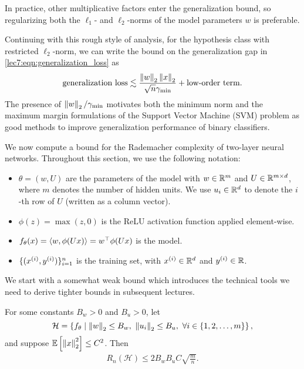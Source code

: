     In practice, other multiplicative factors enter the generalization bound, so regularizing both the $\ell_1$- and $\ell_2$-norms of the model parameters $w$ is preferable.

    Continuing with this rough style of analysis, for the hypothesis class with restricted $\ell_2$-norm, we can write the bound on the generalization gap in \eqref{lec7:eqn:generalization_loss} as
    \begin{equation}
        \text{generalization loss} \lesssim \frac{\Norm{w}_2\Norm{x}_2}{\sqrt{n}\gamma_{\mathrm{min}}} + \text{low-order term}.
    \end{equation}
    The presence of $\Norm{w}_2/\gamma_{\mathrm{min}}$ motivates both the minimum norm and the maximum margin formulations of the Support Vector Machine (SVM) problem as good methods to improve generalization performance of binary classifiers.

We now compute a bound for the Rademacher complexity of two-layer neural networks.  Throughout this section, we use the following notation:
\begin{itemize}
    \item $\theta = (w, U)$ are the parameters of the model with $w \in \R^m$ and $U \in \R^{m \times d}$, where $m$ denotes the number of hidden units. We use $u_i\in\R^d$ to denote the $i$-th row of $U$ (written as a column vector).
    \item $\phi(z) = \max(z, 0)$ is the ReLU activation function applied element-wise.
    \item $f_\theta(x) = \inprod{w,\phi(Ux)} = w^\top \phi(Ux)$ is the model.
    \item $\{ (x\sp{i}, y\sp{i}) \}_{i=1}^n$ is the training set, with $x\sp{i}\in\R^d$ and $y\sp{i}\in\R$.
\end{itemize}
We start with a somewhat weak bound which introduces the technical tools we need to derive tighter bounds in subsequent lectures.

\begin{theorem}\label{lec7:thm:thm_3}
    For some constants $B_w > 0$ and $B_u > 0$, let
    \begin{equation}
        \mathcal{H} = \cbr{ f_\theta \mid \Norm{w}_2 \leq B_w,\ \Norm{u_i}_2 \leq B_u,\ \forall i \in \{1,2,\dots,m\} }, 
    \end{equation}
    and suppose $\E\sbr{\Norm{x}_2^2} \leq C^2$. Then
    \begin{align}
        R_n(\mathcal{H}) \le 2 B_w B_u C\sqrt{\frac{m}{n}}.
    \end{align}
\end{theorem}

